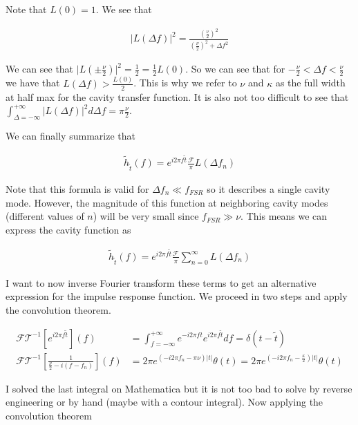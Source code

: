 \documentclass[12pt]{article}
\begin{document}
Note that $L(0) = 1$. We see that

\begin{align}
|L(\Delta f)|^2 = \frac{\left(\frac{\nu}{2}\right)^2}{\left(\frac{\nu}{2} \right)^2 + \Delta f^2}
\end{align}

We can see that $\lvert L\left( \pm\frac{\nu}{2}\right)\rvert^2 = \frac{1}{2} = \frac{1}{2} L(0)$. So we can see that for $-\frac{\nu}{2} < \Delta f < \frac{\nu}{2}$ we have that $L(\Delta f) > \frac{L(0)}{2}$. This is why we refer to $\nu$ and $\kappa$ as the full width at half max for the cavity transfer function.
It is also not too difficult to see that $\int_{\Delta = -\infty}^{+\infty} |L(\Delta f)|^2 d\Delta f= \pi \frac{\nu}{2}$.

We can finally summarize that

\begin{align}
\tilde{h}_{\tilde{t}}(f) = e^{i 2\pi f \tilde{t}} \frac{\mathcal{F}}{\pi}L(\Delta f_n)
\end{align}

Note that this formula is valid for $\Delta f_n \ll f_{FSR}$ so it describes a single cavity mode. However, the magnitude of this function at neighboring cavity modes (different values of $n$) will be very small since $f_{FSR} \gg \nu$. This means we can express the cavity function as

\begin{align}
\tilde{h}_{\tilde{t}}(f) = e^{i 2\pi f \tilde{t}} \frac{\mathcal{F}}{\pi}\sum_{n=0}^{\infty} L(\Delta f_n)
\end{align}

I want to now inverse Fourier transform these terms to get an alternative expression for the impulse response function. We proceed in two steps and apply the convolution theorem.

\begin{align}
\mathcal{FT}^{-1}[e^{i 2\pi f \tilde{t}}](f) &= \int_{f=-\infty}^{+\infty} e^{-i 2\pi f t} e^{i 2\pi f \tilde{t}} df = \delta(t-\tilde{t})\\
\mathcal{FT}^{-1}\left[\frac{1}{\frac{\nu}{2} - i (f-f_n)} \right](f) &= 2 \pi e^{(-i 2 \pi f_n - \pi \nu)|t|} \theta(t) = 2\pi e^{\left(-i 2\pi f_n - \frac{\kappa}{2}\right)|t|}\theta(t)
\end{align}

I solved the last integral on Mathematica but it is not too bad to solve by reverse engineering or by hand (maybe with a contour integral). Now applying the convolution theorem
\end{document}

